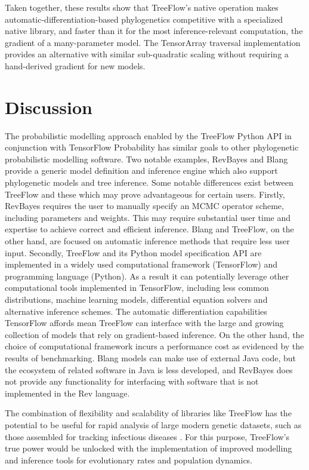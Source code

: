 \documentclass{article}
\begin{document}
Taken together, these results show that TreeFlow's native operation makes automatic-differentiation-based phylogenetics competitive with a specialized native library, and faster than it for the most inference-relevant computation, the gradient of a many-parameter model. The TensorArray traversal implementation provides an alternative with similar sub-quadratic scaling without requiring a hand-derived gradient for new models.

\section{Discussion}

The probabilistic modelling approach enabled by the TreeFlow Python API in conjunction with TensorFlow Probability has similar goals to other phylogenetic probabilistic modelling software. Two notable examples, RevBayes \cite{hohna2016revbayes} and Blang \cite{bouchard2022blang} provide a generic model definition and inference engine which also support phylogenetic models and tree inference. Some notable differences exist between TreeFlow and these which may prove advantageous for certain users. Firstly, RevBayes requires the user to manually specify an MCMC operator scheme, including parameters and weights. This may require substantial user time and expertise to achieve correct and efficient inference. Blang and TreeFlow, on the other hand, are focused on automatic inference methods that require less user input. Secondly, TreeFlow and its Python model specification API are implemented in a widely used computational framework (TensorFlow) and programming language (Python). As a result it can potentially leverage other computational tools implemented in TensorFlow, including less common distributions, machine learning models, differential equation solvers and alternative inference schemes. The automatic differentiation capabilities TensorFlow affords mean TreeFlow can interface with the large and growing collection of models that rely on gradient-based inference. On the other hand, the choice of computational framework incurs a performance cost as evidenced by the results of benchmarking. Blang models can make use of external Java code, but the ecosystem of related software in Java is less developed, and RevBayes does not provide any functionality for interfacing with software that is not implemented in the Rev language.

The combination of flexibility and scalability of libraries like TreeFlow has the potential to be useful for rapid analysis of large modern genetic datasets, such as those assembled for tracking infectious diseases \cite{hadfield2018nextstrain}. For this purpose, TreeFlow's true power would be unlocked with the implementation of improved modelling and inference tools for evolutionary rates and population dynamics.
\end{document}
